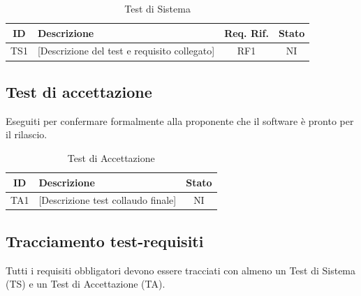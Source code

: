 \begin{table}[H]
	\centering
	\renewcommand{\arraystretch}{1.3}
	\begin{tabularx}{\textwidth}{|c|X|c|c|}
		\hline
		\rowcolor{primarycolor!10}
		\textbf{ID} & \textbf{Descrizione} & \textbf{Req. Rif.} & \textbf{Stato} \\
		\hline
		TS1 & {[Descrizione del test e requisito collegato]} & RF1 & NI \\
		\hline
	\end{tabularx}
	\caption{Test di Sistema}
\end{table}

\subsection{Test di accettazione}
Eseguiti per confermare formalmente alla proponente che il software è pronto per il rilascio.

\begin{table}[H]
	\centering
	\renewcommand{\arraystretch}{1.3}
	\begin{tabularx}{\textwidth}{|c|X|c|}
		\hline
		\rowcolor{primarycolor!10}
		\textbf{ID} & \textbf{Descrizione} & \textbf{Stato} \\
		\hline
		TA1 & {[Descrizione test collaudo finale]} & NI \\
		\hline
	\end{tabularx}
	\caption{Test di Accettazione}
\end{table}

\subsection{Tracciamento test-requisiti}
Tutti i requisiti obbligatori devono essere tracciati con almeno un Test di Sistema (TS) e un Test di Accettazione (TA).